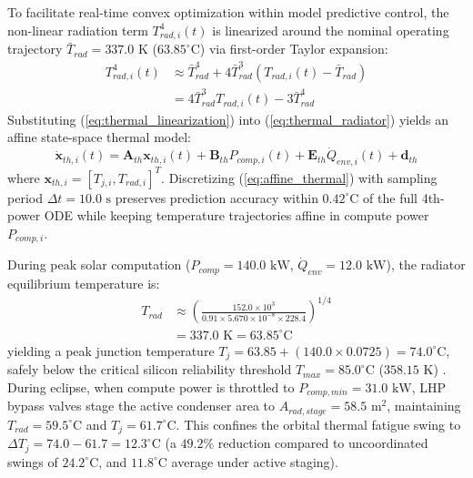 \documentclass[journal]{IEEEtran}
\begin{document}
To facilitate real-time convex optimization within model predictive control, the non-linear radiation term $T_{rad,i}^4(t)$ is linearized around the nominal operating trajectory $\bar{T}_{rad} = 337.0\text{ K}$ ($63.85^\circ\text{C}$) via first-order Taylor expansion:
\begin{equation}
\begin{split}
    T_{rad,i}^4(t) &\approx \bar{T}_{rad}^4 + 4 \bar{T}_{rad}^3 \left(T_{rad,i}(t) - \bar{T}_{rad}\right) \\
    &= 4 \bar{T}_{rad}^3 T_{rad,i}(t) - 3 \bar{T}_{rad}^4
\end{split}
\label{eq:thermal_linearization}
\end{equation}
Substituting (\ref{eq:thermal_linearization}) into (\ref{eq:thermal_radiator}) yields an affine state-space thermal model:
\begin{equation}
    \dot{\mathbf{x}}_{th,i}(t) = \mathbf{A}_{th} \mathbf{x}_{th,i}(t) + \mathbf{B}_{th} P_{comp,i}(t) + \mathbf{E}_{th} \dot{Q}_{env,i}(t) + \mathbf{d}_{th}
    \label{eq:affine_thermal}
\end{equation}
where $\mathbf{x}_{th,i} = [T_{j,i}, T_{rad,i}]^T$. Discretizing (\ref{eq:affine_thermal}) with sampling period $\Delta t = 10.0\text{ s}$ preserves prediction accuracy within $0.42^\circ\text{C}$ of the full 4th-power ODE while keeping temperature trajectories affine in compute power $P_{comp,i}$.

During peak solar computation ($P_{comp} = 140.0\text{ kW}$, $\dot{Q}_{env} = 12.0\text{ kW}$), the radiator equilibrium temperature is:
\begin{equation}
\begin{split}
    T_{rad} &\approx \left( \frac{152.0 \times 10^3}{0.91 \times 5.670 \times 10^{-8} \times 228.4} \right)^{1/4} \\
    &= 337.0\text{ K} = 63.85^\circ\text{C}
\end{split}
\label{eq:t_rad_calc}
\end{equation}
yielding a peak junction temperature $T_j = 63.85 + (140.0 \times 0.0725) = 74.0^\circ\text{C}$, safely below the critical silicon reliability threshold $T_{max} = 85.0^\circ\text{C}$ ($358.15\text{ K}$) \cite{skadron2004temperature, bartolini2013thermal}. During eclipse, when compute power is throttled to $P_{comp,min} = 31.0\text{ kW}$, LHP bypass valves stage the active condenser area to $A_{rad,stage} = 58.5\text{ m}^2$, maintaining $T_{rad} = 59.5^\circ\text{C}$ and $T_j = 61.7^\circ\text{C}$. This confines the orbital thermal fatigue swing to $\Delta T_j = 74.0 - 61.7 = 12.3^\circ\text{C}$ (a $49.2\%$ reduction compared to uncoordinated swings of $24.2^\circ\text{C}$, and $11.8^\circ\text{C}$ average under active staging).
\end{document}
